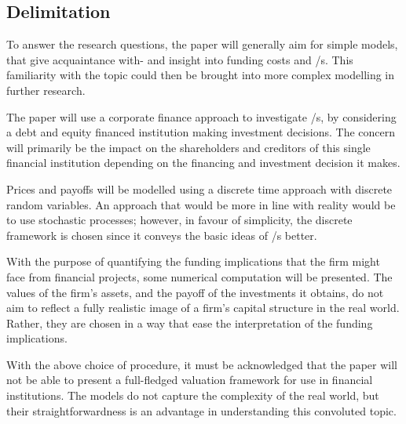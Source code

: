 \documentclass[main.tex]{subfiles}
\begin{document}
    \subsection{Delimitation}

    To answer the research questions, the paper will generally aim for simple models,
    that give acquaintance with- and insight into funding costs and \FVA/s.
    This familiarity with the topic could then be brought into more complex modelling
    in further research.

    The paper will use a corporate finance approach to investigate \FVA/s,
    by considering a debt and equity financed institution making investment decisions.
    The concern will primarily be the impact on the shareholders and creditors 
    of this single financial institution depending on the financing and investment decision it makes.

    Prices and payoffs will be modelled using a discrete time approach 
    with discrete random variables.
    An approach that would be more in line with reality would be to use stochastic processes;
    however, in favour of simplicity, the discrete framework is chosen 
    since it conveys the basic ideas of \FVA/s better.

    With the purpose of quantifying the funding implications that the firm might face from financial projects,
    some numerical computation will be presented.
    The values of the firm's assets, and the payoff of the investments it obtains,
    do not aim to reflect a fully realistic image of a firm's capital structure in the real world.
    Rather, they are chosen in a way that ease the interpretation of the funding implications.

    With the above choice of procedure, it must be acknowledged that the paper will not be able to
    present a full-fledged valuation framework for use in financial institutions.
    The models do not capture the complexity of the real world,
    but their straightforwardness is an advantage in understanding this convoluted topic.
\end{document}
